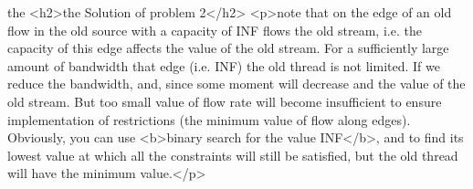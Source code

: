 the <h2>the Solution of problem 2</h2>
<p>note that on the edge of an old flow in the old source with a capacity of INF flows the old stream, i.e. the capacity of this edge affects the value of the old stream. For a sufficiently large amount of bandwidth that edge (i.e. INF) the old thread is not limited. If we reduce the bandwidth, and, since some moment will decrease and the value of the old stream. But too small value of flow rate will become insufficient to ensure implementation of restrictions (the minimum value of flow along edges). Obviously, you can use <b>binary search for the value INF</b>, and to find its lowest value at which all the constraints will still be satisfied, but the old thread will have the minimum value.</p>